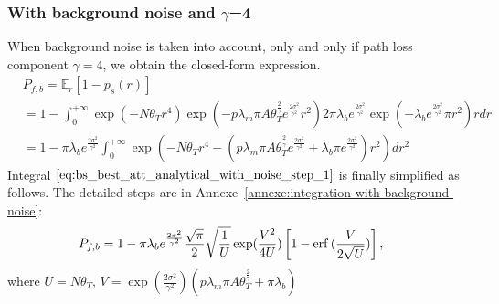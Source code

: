 \subsubsection{With background noise and $\gamma$=4}
\label{subsub:with_background_noise}
When background noise is taken into account, only and only if path loss component $\gamma=4$, we obtain the closed-form expression. 
\begin{align}
	\label{eq:bs_best_att_analytical_with_noise_step_1}
	&P_{f,b}= \mathbb{E}_{r}\left[ 1-p_{s}\left(r\right) \right]  \nonumber\\
	&= 1 -\int_{0}^{+\infty}   \exp(-N \theta_{T} r^{4} ) \exp(-p \lambda_{m} \pi A \theta_{T}^{\frac{2}{\gamma}} e^{\frac{2\sigma^2}{\gamma^2}}  r^2 ) 2 \pi \lambda_b e^{\frac{2\sigma^2}{\gamma^2}}  \exp( -\lambda_b  e^{\frac{2\sigma^2}{\gamma^2}} \pi r^2 ) r dr \nonumber\\
	&= 1 -\pi \lambda_b e^{\frac{2\sigma^2}{\gamma^2}} \int_{0}^{+\infty}   \exp(-N \theta_{T} r^{4} -(p \lambda_{m} \pi A \theta_{T}^{\frac{2}{\gamma}} e^{\frac{2\sigma^2}{\gamma^2}}  + \lambda_b \pi  e^{\frac{2\sigma^2}{\gamma^2}} )r^2 )  dr^2
\end{align}
Integral $\eqref{eq:bs_best_att_analytical_with_noise_step_1}$ is finally simplified as follows. The detailed steps are in Annexe~\ref{annexe:integration-with-background-noise}:
\begin{align}
	\label{eq:bs_best_att_analytical_with_noise}
	P_{f,b}
	&= 1 - \pi \lambda_b e^{\frac{2\sigma^2}{\gamma^2}} \frac{\sqrt{\pi}}{2} \sqrt{\frac{1}{U}}\exp(\frac{V^2}{4U})\left[ 1 - \mathrm{erf}\,(\frac{V}{2\sqrt{U}})\right],
\end{align}
where $U=N \theta_{T}$, $V=\exp \left( \frac{2\sigma^2}{\gamma^2}  \right) \left( p \lambda_{m} \pi A \theta_{T}^{\frac{2}{\gamma}} + \pi \lambda_b \right)$

